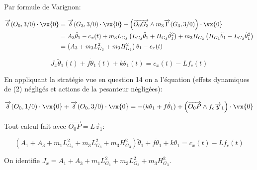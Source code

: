 \ifprof
\begin{corrige}
Par formule de Varignon:

\begin{align*}
\overrightarrow{\delta}(O_0,3/0)\cdot \vx{0} &= \overrightarrow{\delta}(G_3,3/0)\cdot \vx{0} + \left( \overrightarrow{O_0 G_3} \wedge m_3\overrightarrow{\Gamma}(G_3,3/0) \right)\cdot \vx{0} \\
&= A_3 \ddot{\theta}_1 - c_x(t) +m_3L_{G_3}\left(L_{G_3}\ddot{\theta}_1 + H_{G_3}\dot{\theta}_1^2\right) + m_3 H_{G_3}\left(H_{G_3}\ddot{\theta}_1 - L_{G_3}\dot{\theta}_1^2\right)\\
&= \left(A_3 +m_3L_{G_3}^2 +m_3H_{G_3}^2\right) \ddot{\theta}_1 - c_x(t)
\end{align*}
 

\end{corrige}
\else
\fi

$$
J_{x} \ddot{\theta}_{1}(t)+f \dot{\theta}_{1}(t)+k \theta_{1}(t)=c_{x}(t)-L f_{c}(t)
$$
\ifprof
\begin{corrige}
En appliquant la stratégie vue en question 14 on a l'équation (effets dynamiques de (2) négligés et actions de la pesanteur négligées):

$$ \overrightarrow{\delta}(O_0,1/0)\cdot \vx{0} + \overrightarrow{\delta}(O_0,3/0)\cdot \vx{0} = -(k\theta_1 + f \dot{\theta}_1) + \left( \overrightarrow{O_0 P} \wedge f_c \overrightarrow{y}_1 \right)\cdot \vx{0} $$ 

Tout calcul fait avec $\overrightarrow{O_0 P} = L \overrightarrow{z}_1$:

$$ \boxed{ \left( A_1 + A_3 + m_1 L_{G_1}^2 + m_3 L_{G_3}^2 + m_3 H_{G_3}^2 \right)\ddot{\theta}_1 + f \dot{\theta}_1 + k\theta_1 = c_x(t) -L f_c(t)} $$

On identifie $\boxed{J_x = A_1 + A_3 + m_1 L_{G_1}^2 + m_3 L_{G_3}^2 + m_3 H_{G_3}^2}$.

\end{corrige}
\else
\fi

